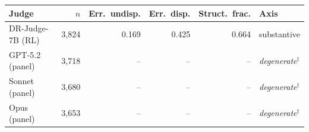 \begin{tabular}{lrrrrl}
\toprule
Judge & $n$ & Err.\ undisp. & Err.\ disp. & Struct.\ frac. & Axis\\
\midrule
DR-Judge-7B (RL) & 3,824 & 0.169 & 0.425 & 0.664 & substantive \\
GPT-5.2 (panel) & 3,718 & -- & -- & -- & \textit{degenerate}$^\dagger$ \\
Sonnet (panel) & 3,680 & -- & -- & -- & \textit{degenerate}$^\dagger$ \\
Opus (panel) & 3,653 & -- & -- & -- & \textit{degenerate}$^\dagger$ \\
\bottomrule
\end{tabular}